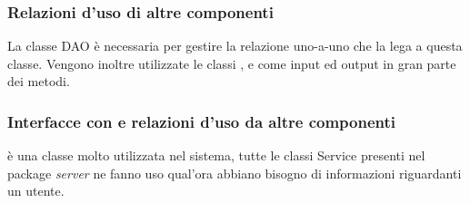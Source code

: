 \subsubsection*{Relazioni d'uso di altre componenti}
La classe DAO  \`e necessaria per gestire la relazione
uno-a-uno che la lega a questa classe. Vengono inoltre utilizzate le classi
,  e  come input ed output in
gran parte dei metodi. 
\subsubsection*{Interfacce con e relazioni d'uso da altre componenti}
 \`e una classe molto utilizzata nel sistema, tutte le classi
Service presenti nel package \emph{server} ne fanno uso qual'ora abbiano bisogno
di informazioni riguardanti un utente. 
